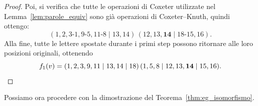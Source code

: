 \begin{proof}
    Poi, si verifica che tutte le operazioni di Coxeter utilizzate nel
    Lemma~\ref{lem:parole_equiv} sono gi\`a operazioni di Coxeter--Knuth, quindi ottengo:
    \[
        ( 1, 2 , 3\text{-} 1, 9 \text{-} 5,
        11 \text{-} 8\mid  13, 14  ) \,
        ( 12, 13, \mathbf{14} \mid 18 \text{-}15,  16).
    \]
    Alla fine, tutte le lettere spostate durante i primi step
    possono ritornare alle loro posizioni originali, ottenendo
    \[
        f_1(v) = 
        ( 1, 2, 3, 9, 11 \mid 13, 14 \mid 18 ) \,
        ( 1, 5, 8 \mid 12, 13, \mathbf{14} \mid 15, 16).
        \qedhere
    \]
\end{proof}

Possiamo ora procedere con la dimostrazione del Teorema~\ref{thm:eg_isomorfismo}.

